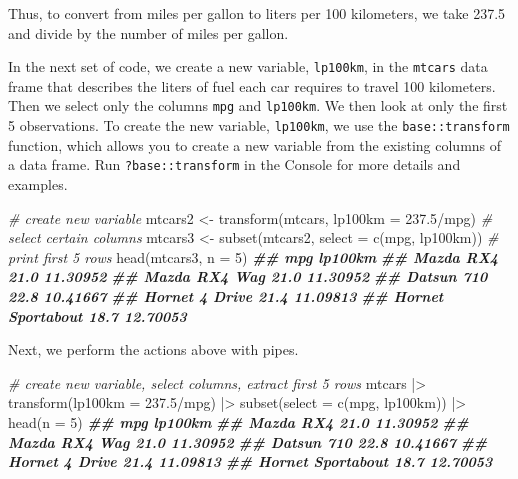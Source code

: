 \documentclass[
]{book}
\newenvironment{Shaded}{\begin{snugshade}}{\end{snugshade}}
\newcommand{\AttributeTok}[1]{\textcolor[rgb]{0.77,0.63,0.00}{#1}}
\newcommand{\CommentTok}[1]{\textcolor[rgb]{0.56,0.35,0.01}{\textit{#1}}}
\newcommand{\DecValTok}[1]{\textcolor[rgb]{0.00,0.00,0.81}{#1}}
\newcommand{\DocumentationTok}[1]{\textcolor[rgb]{0.56,0.35,0.01}{\textbf{\textit{#1}}}}
\newcommand{\FloatTok}[1]{\textcolor[rgb]{0.00,0.00,0.81}{#1}}
\newcommand{\FunctionTok}[1]{\textcolor[rgb]{0.00,0.00,0.00}{#1}}
\newcommand{\NormalTok}[1]{#1}
\newcommand{\OtherTok}[1]{\textcolor[rgb]{0.56,0.35,0.01}{#1}}
\newcommand{\SpecialCharTok}[1]{\textcolor[rgb]{0.00,0.00,0.00}{#1}}
\theoremstyle{definition}
\theoremstyle{definition}
\theoremstyle{definition}
\theoremstyle{definition}
\theoremstyle{remark}
\begin{document}
Thus, to convert from miles per gallon to liters per 100 kilometers, we take 237.5 and divide by the number of miles per gallon.

In the next set of code, we create a new variable, \texttt{lp100km}, in the \texttt{mtcars} data frame that describes the liters of fuel each car requires to travel 100 kilometers. Then we select only the columns \texttt{mpg} and \texttt{lp100km}. We then look at only the first 5 observations. To create the new variable, \texttt{lp100km}, we use the \texttt{base::transform} function, which allows you to create a new variable from the existing columns of a data frame. Run \texttt{?base::transform} in the Console for more details and examples.

\begin{Shaded}
\begin{Highlighting}[]
\CommentTok{\# create new variable}
\NormalTok{mtcars2 }\OtherTok{\textless{}{-}} \FunctionTok{transform}\NormalTok{(mtcars, }\AttributeTok{lp100km =} \FloatTok{237.5}\SpecialCharTok{/}\NormalTok{mpg)}
\CommentTok{\# select certain columns}
\NormalTok{mtcars3 }\OtherTok{\textless{}{-}} \FunctionTok{subset}\NormalTok{(mtcars2, }\AttributeTok{select =} \FunctionTok{c}\NormalTok{(mpg, lp100km))}
\CommentTok{\# print first 5 rows}
\FunctionTok{head}\NormalTok{(mtcars3, }\AttributeTok{n =} \DecValTok{5}\NormalTok{)}
\DocumentationTok{\#\#                    mpg  lp100km}
\DocumentationTok{\#\# Mazda RX4         21.0 11.30952}
\DocumentationTok{\#\# Mazda RX4 Wag     21.0 11.30952}
\DocumentationTok{\#\# Datsun 710        22.8 10.41667}
\DocumentationTok{\#\# Hornet 4 Drive    21.4 11.09813}
\DocumentationTok{\#\# Hornet Sportabout 18.7 12.70053}
\end{Highlighting}
\end{Shaded}

Next, we perform the actions above with pipes.

\begin{Shaded}
\begin{Highlighting}[]
\CommentTok{\# create new variable, select columns, extract first 5 rows}
\NormalTok{mtcars }\SpecialCharTok{|\textgreater{}}
  \FunctionTok{transform}\NormalTok{(}\AttributeTok{lp100km =} \FloatTok{237.5}\SpecialCharTok{/}\NormalTok{mpg) }\SpecialCharTok{|\textgreater{}}
  \FunctionTok{subset}\NormalTok{(}\AttributeTok{select =} \FunctionTok{c}\NormalTok{(mpg, lp100km)) }\SpecialCharTok{|\textgreater{}}
  \FunctionTok{head}\NormalTok{(}\AttributeTok{n =} \DecValTok{5}\NormalTok{)}
\DocumentationTok{\#\#                    mpg  lp100km}
\DocumentationTok{\#\# Mazda RX4         21.0 11.30952}
\DocumentationTok{\#\# Mazda RX4 Wag     21.0 11.30952}
\DocumentationTok{\#\# Datsun 710        22.8 10.41667}
\DocumentationTok{\#\# Hornet 4 Drive    21.4 11.09813}
\DocumentationTok{\#\# Hornet Sportabout 18.7 12.70053}
\end{Highlighting}
\end{Shaded}
\end{document}
